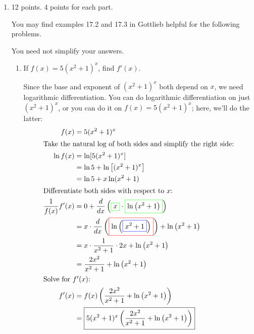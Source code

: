 \documentclass{article}
\begin{document}
\begin{enumerate}[topsep=0pt]
\item

\begin{grading}
12 points. 4 points for each part.
\end{grading}

 You may find examples 17.2 and
  17.3 in Gottlieb helpful for the following
  problems.

 You need not simplify your
  answers.
  \begin{enumerate}

  \item %
    \begin{problem}[\vfill]
      If $f(x) =5(x^2+1)^x$, find $f'(x)$.
    \end{problem}

    \begin{solution}
      Since the base and exponent of $(x^2 + 1)^x$ both depend on $x$, we
      need logarithmic differentiation.  You can do logarithmic
      differentiation on just $(x^2 + 1)^x$, or you can do it on $f(x) = 5
      (x^2 + 1)^x$; here, we'll do the latter:
      \begin{align*}
        f(x) &= 5(x^2 + 1)^x \\
        \intertext{Take the natural log of both sides and simplify the
          right side:}
        \ln f(x) &= \ln [5 (x^2 + 1)^x] \\
        &= \ln 5 + \ln \left[ (x^2 + 1)^x \right] \\
        &= \ln 5 + x \ln (x^2 + 1) \\
        \intertext{Differentiate both sides with respect to $x$:}
        \frac{1}{f(x)} f'(x) &= 0 + \frac{d}{dx}
        \left(\fcolorbox{green}{white}{$\displaystyle x$}\cdot
          \fcolorbox{green}{white}{$\displaystyle \ln\left(x^
              { 2} + 1\right)$}\right) \\
        &= x\cdot \frac{d}{dx} \left(\fcolorbox{red}{white}{$\displaystyle
            \ln\left(\fcolorbox{blue}{white}{$\displaystyle x^ { 2} +
                1$}\right)$}\right)+ \ln\left(x^ { 2} + 1\right) \\
        &= x\cdot \frac{1}{x^ { 2} + 1}\cdot 2
        x+ \ln\left(x^ { 2} + 1\right) \\
        &= \frac{2x^2}{x^2 + 1} + \ln\left(x^ { 2} + 1\right) \\
        \shortintertext{Solve for $f'(x)$:} f'(x) &= f(x) \left(
          \frac{2x^2}{x^2 + 1} + \ln\left(x^ { 2} + 1\right) \right) \\
        &= \boxed{5(x^2 + 1)^x \left( \frac{2x^2}{x^2 + 1} + \ln\left(x^ {
                2} + 1\right) \right)}
      \end{align*}
    \end{solution}


\end{enumerate}
\end{enumerate}
\end{document}
